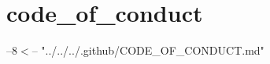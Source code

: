\chapter{code\+\_\+of\+\_\+conduct }
\hypertarget{md_include_2nlohman_2json-develop_2docs_2mkdocs_2docs_2community_2code__of__conduct}{}\label{md_include_2nlohman_2json-develop_2docs_2mkdocs_2docs_2community_2code__of__conduct}
--8\texorpdfstring{$<$}{<}-- "{}../\+../\+../\+.\+github/\+\+CODE\+\_\+\+OF\+\_\+\+CONDUCT.\+md"{} 